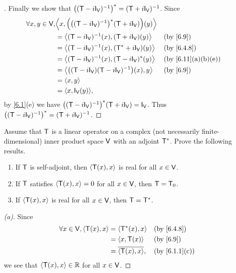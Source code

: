 \begin{proof}[]
  Finally we show that \(\pa{(\T - i \IT[\V])^{-1}}^* = (\T + i \IT[\V])^{-1}\).
  Since
  \begin{align*}
    \forall x, y \in \V, & \inn{x, \pa{\pa{(\T - i \IT[\V])^{-1}}^* (\T + i \IT[\V])}(y)}                       \\
                         & = \inn{(\T - i \IT[\V])^{-1}(x), (\T + i \IT[\V])(y)}          &  & \by{6.9}         \\
                         & = \inn{(\T - i \IT[\V])^{-1}(x), (\T^* + i \IT[\V])(y)}        &  & \by{6.4.8}       \\
                         & = \inn{(\T - i \IT[\V])^{-1}(x), (\T - i \IT[\V])^*(y)}        &  & \by{6.11}[a,b,e] \\
                         & = \inn{\pa{(\T - i \IT[\V]) (\T - i \IT[\V])^{-1}}(x), y}      &  & \by{6.9}         \\
                         & = \inn{x, y}                                                                         \\
                         & = \inn{x, \IT[\V](y)},
  \end{align*}
  by \cref{6.1}(e) we have \(\pa{(\T - i \IT[\V])^{-1}}^* (\T + i \IT[\V]) = \IT[\V]\).
  Thus \(\pa{(\T - i \IT[\V])^{-1}}^* = (\T + i \IT[\V])^{-1}\).
\end{proof}

\begin{ex}\label{ex:6.4.11}
  Assume that \(\mathsf{T}\) is a linear operator on a complex (not necessarily finite-dimensional) inner product space \(\mathsf{V}\) with an adjoint \(\mathsf{T}^*\).
  Prove the following results.
  \begin{enumerate}
    \item If \(\mathsf{T}\) is self-adjoint, then \(\left\langle\mathsf{T}(x), x\right\rangle\) is real for all \(x \in \mathsf{V}\).
    \item If \(\mathsf{T}\) satisfies \(\left\langle\mathsf{T}(x), x\right\rangle = 0\) for all \(x \in \mathsf{V}\), then \(\mathsf{T} = \mathsf{T}_0\).
    \item If \(\left\langle\mathsf{T}(x), x\right\rangle\) is real for all \(x \in \mathsf{V}\), then \(\mathsf{T} = \mathsf{T}^*\).
  \end{enumerate}
\end{ex}

\begin{proof}[(a)]
  Since
  \begin{align*}
    \forall x \in \V, \inn{\T(x), x} & = \inn{\T^*(x), x}       &  & \by{6.4.8}    \\
                                     & = \inn{x, \T(x)}         &  & \by{6.9}      \\
                                     & = \conj{\inn{\T(x), x}}, &  & \by{6.1.1}[c]
  \end{align*}
  we see that \(\left\langle\mathsf{T}(x), x\right\rangle \in \mathbb{R}\) for all \(x \in \mathsf{V}\).
\end{proof}

